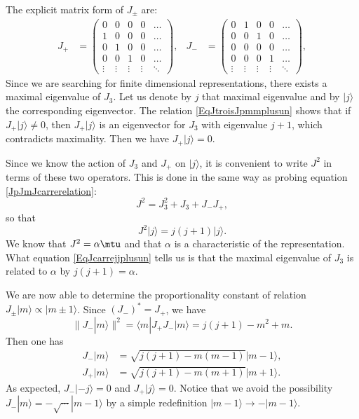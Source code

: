 The explicit matrix form of $J_{\pm}$ are:
\begin{align}
J_{+}&=
\begin{pmatrix}
0   &   0   &   0   &0  &\hdots\\
1   &   0   &   0   &0  &\hdots\\
0   &   1   &   0   &0  &\hdots\\
0   &   0   &   1   &0  &\hdots\\
\vdots  &   \vdots  &   \vdots  &\vdots &\ddots
\end{pmatrix},
&J_{-}&=
\begin{pmatrix}
0   &   1   &   0   &0  &\hdots\\
0   &   0   &   1   &0  &\hdots\\
0   &   0   &   0   &0  &\hdots\\
0   &   0   &   0   &1  &\hdots\\
\vdots  &   \vdots  &   \vdots  &\vdots &\ddots
\end{pmatrix},
\end{align}
Since we are searching for finite dimensional representations, there exists a maximal eigenvalue of $J_3$. Let us denote by $j$ that maximal eigenvalue and by $| j \rangle$ the corresponding eigenvector. The relation \eqref{EqJtroisJpmmplusun} shows that if $J_+| j \rangle\neq 0$, then $J_+| j \rangle$ is an eigenvector for $J_3$ with eigenvalue $j+1$, which contradicts maximality. Then we have $J_+| j \rangle=0$.

Since we know the action of $J_3$ and $J_+$ on $| j \rangle$, it is convenient to write $J^2$ in terms of these two operators. This is done in the same way as probing equation \eqref{JpJmJcarrerelation}:
\begin{equation}
    J^2=J_3^2+J_3+J_-J_+,
\end{equation}
so that
\begin{equation}        \label{EqJcarrejjplusun}
    J^2| j \rangle=j(j+1)| j \rangle.
\end{equation}
We know that $J^2=\alpha\mtu$ and that $\alpha$ is a characteristic of the representation. What equation \eqref{EqJcarrejjplusun} tells us is that the maximal eigenvalue of $J_3$ is related to $\alpha$ by $j(j+1)=\alpha$.

We are now able to determine the proportionality constant of relation $J_{\pm}| m \rangle\propto| m\pm 1 \rangle$. Since $(J_-)^*=J_+$, we have
\begin{equation}    \label{EqnormeJmoinm}
    \| J_-| m \rangle \|^2=\langle m| J_+J_- | m \rangle = j(j+1)-m^2+m.
\end{equation}
Then one has
\begin{subequations}
    \begin{align}
        J_-| m \rangle  &=\sqrt{j(j+1)-m(m-1)}| m-1 \rangle,    \label{EqJmoinsmanglemmointun}      \\
        J_+| m \rangle  &=\sqrt{j(j+1)-m(m+1)}| m+1 \rangle.
    \end{align}
\end{subequations}
As expected, $J_-| -j \rangle=0$ and $J_+| j \rangle=0$. Notice that we avoid the possibility $J_-| m \rangle=-\sqrt{\cdots}| m-1 \rangle$ by a simple redefinition $| m-1 \rangle\to -| m-1 \rangle$.

